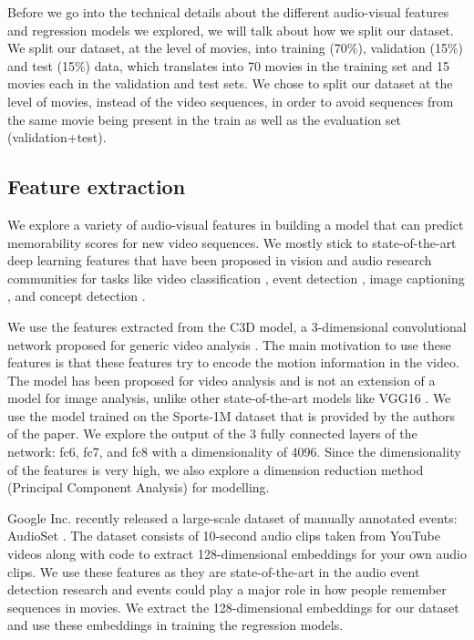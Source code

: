 \documentclass[sigconf]{acmart}
\begin{document}
Before we go into the technical details about the different audio-visual features and regression models we explored, we will talk about how we split our dataset.
We split our dataset, at the level of movies, into training (70\%), validation (15\%) and test (15\%) data, which translates into 70 movies in the training set and 15 movies each in the validation and test sets.
We chose to split our dataset at the level of movies, instead of the video sequences, in order to avoid sequences from the same movie being present in the train as well as the evaluation set (validation+test).

\subsection{Feature extraction}
\label{feat-extr}
We explore a variety of audio-visual features in building a model that can predict memorability scores for new video sequences.
We mostly stick to state-of-the-art deep learning features that have been proposed in vision and audio research communities for tasks like video classification \cite{c3d-feat}, event detection \cite{audioset-feat}, image captioning \cite{caption-feat}, and concept detection \cite{sb-feat}. 

We use the features extracted from the C3D model, a 3-dimensional convolutional network proposed for generic video analysis \cite{c3d-feat}. 
The main motivation to use these features is that these features try to encode the motion information in the video.
The model has been proposed for video analysis and is not an extension of a model for image analysis, unlike other state-of-the-art models like VGG16 \cite{vgg16}.
We use the model trained on the Sports-1M dataset \cite{c3d-feat} that is provided by the authors of the paper.
We explore the output of the 3 fully connected layers of the network: fc6, fc7, and fc8 with a dimensionality of 4096.
Since the dimensionality of the features is very high, we also explore a dimension reduction method (Principal Component Analysis) for modelling.

Google Inc. recently released a large-scale dataset of manually annotated events: AudioSet \cite{audioset-feat}. 
The dataset consists of 10-second audio clips taken from YouTube videos along with code to extract 128-dimensional embeddings for your own audio clips.
We use these features as they are state-of-the-art in the audio event detection research and events could play a major role in how people remember sequences in movies.
We extract the 128-dimensional embeddings for our dataset and use these embeddings in training the regression models.
\end{document}
